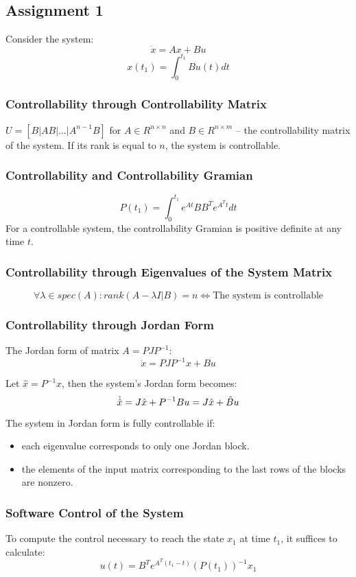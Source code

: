 \subsection{Assignment 1}
Consider the system:
\[\dot{x} = A x + Bu \]
\[x(t_1) = \int_0^{t_1} B u(t) dt\]

\subsubsection{Controllability through Controllability Matrix}
\(U = [B | AB | \hdots | A^{n-1}B]\) for \(A \in R^{n \times n}\) and \(B \in R^{n \times m}\) -- the controllability matrix of the system. If its rank is equal to \(n\), the system is controllable.

\subsubsection{Controllability and Controllability Gramian}
\[P(t_1) = \int_0^{t_1} e^{At} B B^T e^{A^T t} dt\]
For a controllable system, the controllability Gramian is positive definite at any time \(t\).

\subsubsection{Controllability through Eigenvalues of the System Matrix}
\[\forall \lambda \in spec(A): rank(A - \lambda I | B) = n \Longleftrightarrow \text{The system is controllable} \]

\subsubsection{Controllability through Jordan Form}
The Jordan form of matrix \(A = P J P^{-1}\):
\[
        \dot{x} = P J P^{-1} x + Bu 
\]

Let \(\hat{x} = P^{-1}x\), then the system's Jordan form becomes:
\[
        \dot{\hat{x}} = J\hat{x} + P^{-1}Bu = J\hat{x} + \hat{B}u  \\
\]

The system in Jordan form is fully controllable if:
\begin{itemize}
    \item each eigenvalue corresponds to only one Jordan block.
    \item the elements of the input matrix corresponding to the last rows of the blocks are nonzero.
\end{itemize}

\subsubsection{Software Control of the System}
To compute the control necessary to reach the state \(x_1\) at time \(t_1\), it suffices to calculate:
\[u(t) = B^T e^{A^T (t_1 - t)} (P(t_1))^{-1} x_1\]


